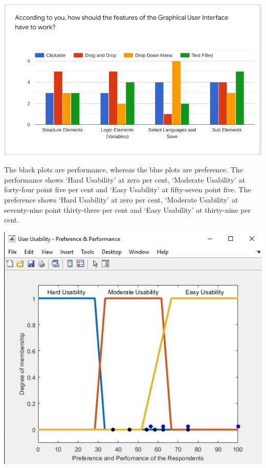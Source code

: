 \documentclass[a0,portrait]{a0poster}
\begin{document}
\begin{multicols}{2}
\begin{center}\vspace{1cm}
\includegraphics[width=0.55\linewidth]{../../Showcase-Work_Completed/Surveying/q11.png}
\label{fig:q-11}
\end{center}\vspace{1cm}

The black plots are performance, whereas the blue plots are preference. The performance shows `Hard Usability' at zero per cent, `Moderate Usability' at forty-four point five per cent and `Easy Usability' at fifty-seven point five. The preference shows `Hard Usability' at zero per cent, `Moderate Usability' at seventy-nine point thirty-three per cent and `Easy Usability' at thirty-nine per cent.

\begin{center}\vspace{1cm}
    \includegraphics[width=0.45\linewidth]{FuzzyLogicPrefPerf.jpg}
    \label{fig:fuzzyLogicPrefPerf}
\end{center}\vspace{1cm}


\end{multicols}
\end{document}
